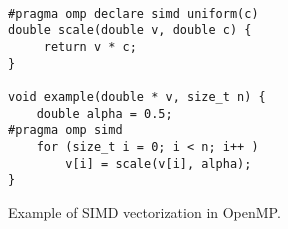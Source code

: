 \begin{figure}
\begin{verbatim}

#pragma omp declare simd uniform(c)
double scale(double v, double c) {
     return v * c;
}

void example(double * v, size_t n) {
    double alpha = 0.5;
#pragma omp simd
    for (size_t i = 0; i < n; i++ )
        v[i] = scale(v[i], alpha);
}
\end{verbatim}
\caption{Example of SIMD vectorization in OpenMP.\label{fig:simd-example}}
\end{figure}



